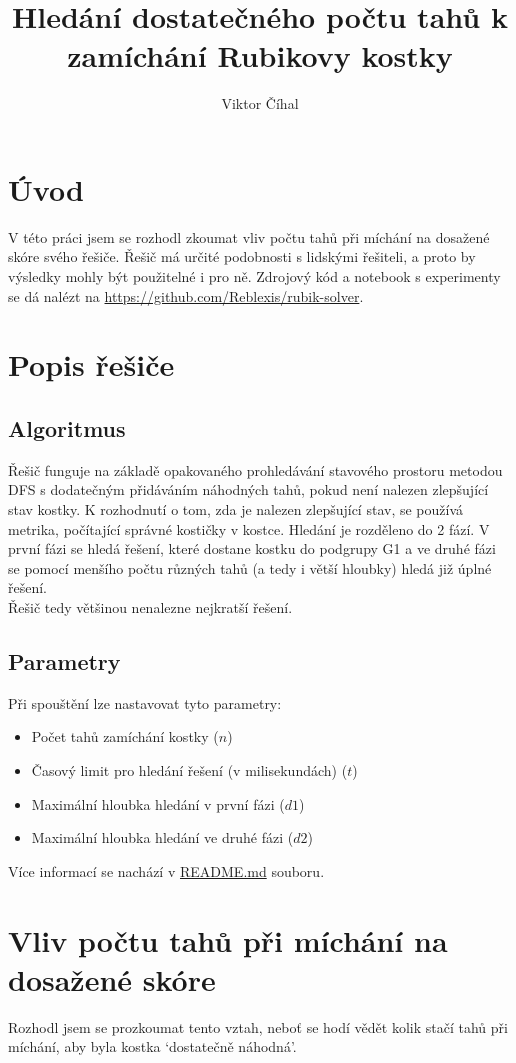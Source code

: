 \documentclass{article}
\title{Hledání dostatečného počtu tahů k zamíchání Rubikovy kostky}
\author{Viktor Číhal}
\date{}
\begin{document}
\maketitle
\section*{Úvod}
V této práci jsem se rozhodl zkoumat vliv počtu tahů při míchání na dosažené skóre svého řešiče.
Řešič má určité podobnosti s lidskými řešiteli, a proto by výsledky mohly být použitelné i pro ně.
Zdrojový kód a notebook s experimenty se dá nalézt na \url{https://github.com/Reblexis/rubik-solver}.

\section*{Popis řešiče}
\subsection*{Algoritmus}
Řešič funguje na základě opakovaného prohledávání stavového prostoru metodou DFS
s dodatečným přidáváním náhodných tahů, pokud není nalezen zlepšující stav kostky.
K rozhodnutí o tom, zda je nalezen zlepšující stav, se používá metrika, počítající
správné kostičky v kostce. Hledání je rozděleno do 2 fází. V první fázi se hledá
řešení, které dostane kostku do podgrupy G1 a ve druhé fázi se pomocí menšího počtu
různých tahů (a tedy i větší hloubky) hledá již úplné řešení.\\
Řešič tedy většinou nenalezne nejkratší řešení.

\subsection*{Parametry}
Při spouštění lze nastavovat tyto parametry:
\begin{itemize}
    \item Počet tahů zamíchání kostky ($n$)
    \item Časový limit pro hledání řešení (v milisekundách) ($t$)
    \item Maximální hloubka hledání v první fázi ($d1$)
    \item Maximální hloubka hledání ve druhé fázi ($d2$)
\end{itemize}

Více informací se nachází v \href{https://github.com/Reblexis/rubik-solver/blob/main/README.md}{README.md} souboru.

\section*{Vliv počtu tahů při míchání na dosažené skóre}
Rozhodl jsem se prozkoumat tento vztah, neboť se hodí vědět kolik stačí tahů při míchání, aby byla kostka
`dostatečně náhodná'. \\
\end{document}

